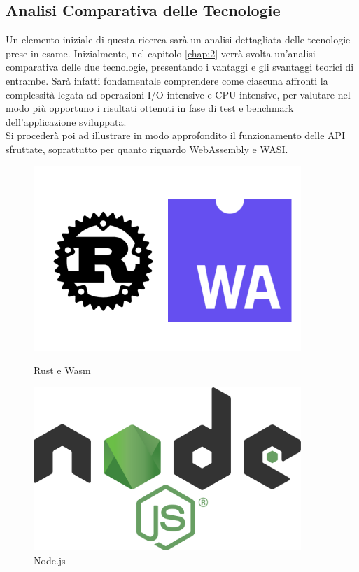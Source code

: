 \subsection{Analisi Comparativa delle Tecnologie}
Un elemento iniziale di questa ricerca sarà un analisi dettagliata delle tecnologie prese in esame. 
Inizialmente, nel capitolo \ref{chap:2} verrà svolta un'analisi comparativa delle due tecnologie, presentando i vantaggi e gli svantaggi teorici di entrambe. Sarà infatti fondamentale comprendere come ciascuna affronti la complessità legata ad operazioni I/O-intensive e CPU-intensive, per valutare nel modo più opportuno i risultati ottenuti in fase di test e benchmark dell'applicazione sviluppata.
\\Si procederà poi ad illustrare in modo approfondito il funzionamento delle API sfruttate, soprattutto per quanto riguardo WebAssembly e WASI.
\begin{figure}
        \centering
        \begin{minipage}{0.40\textwidth}
            \centering
            \includegraphics[width=0.9\textwidth]{images/rustwasm.jpg} %
            \caption{Rust e Wasm}
        \end{minipage}\hfill
        \begin{minipage}{0.40\textwidth}
            \centering
            \includegraphics[width=0.9\textwidth]{images/node.png} %
            \caption{Node.js}
        \end{minipage}
    \end{figure}
